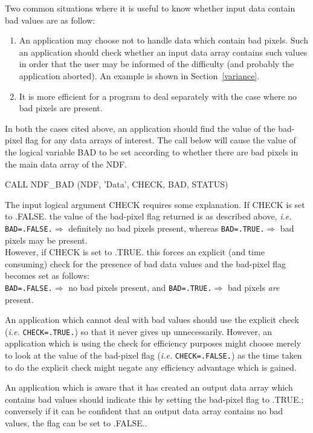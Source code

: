\documentclass[twoside,11pt,nolof]{starlink}
\begin{document}
Two common situations where it is useful to know  whether input data
contain bad values are as follow:
\begin{enumerate}
\item An application may choose not to handle data which contain bad pixels.
Such an application should check whether an input data array contains such
values in order that the
user may be informed of the difficulty (and probably the application aborted).
An example is shown in Section~\ref{variance}.
\item It is more efficient for a program to deal separately with
the case where no bad pixels are present.
\end{enumerate}
In both the cases cited above, an application should find
the value of the bad-pixel flag for any data arrays of interest.
The call below will cause the value of the logical
variable BAD to be set according
to whether there are bad pixels in the main data array of the NDF.
\begin{terminalv}
      CALL NDF_BAD (NDF, 'Data', CHECK, BAD, STATUS)
\end{terminalv}
The input logical argument CHECK requires some explanation.
If CHECK is set to .FALSE. the value of the bad-pixel flag returned is as
described above, \textit{i.e.}\\
\texttt{BAD=.FALSE.}$\Rightarrow$ definitely no bad pixels present, whereas
\texttt{BAD=.TRUE.}$\Rightarrow$ bad pixels may be present.\\
However, if CHECK is set to .TRUE. this forces an explicit (and time
consuming) check for the presence of bad data values and the bad-pixel flag
becomes set as follows: \\
\texttt{BAD=.FALSE.}$\Rightarrow$ no bad pixels present, and
\texttt{BAD=.TRUE.}$\Rightarrow$  bad pixels {\sl are\/} present.

An application which cannot deal with bad values should use the explicit
check (\textit{i.e.} \texttt{CHECK=.TRUE.}) so that it never gives up unnecessarily.
However, an application which is using the check for efficiency purposes
might choose merely to look at the value of the bad-pixel flag
(\textit{i.e.} \texttt{CHECK=.FALSE.}) as the time taken to do the explicit
check might negate any efficiency advantage which is gained.


An application which is aware that it has created an output data array
which contains bad values should indicate this by setting the bad-pixel
flag to .TRUE.;
conversely if it can be confident that an output data array contains no
bad values, the flag can be set to .FALSE..
\end{document}
